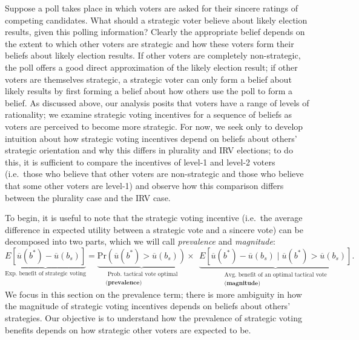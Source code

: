 \documentclass[11pt,a4paper]{article}
\begin{document}
Suppose a poll takes place in which voters are asked for their sincere ratings of competing candidates. What should a strategic voter believe about likely election results, given this polling information? Clearly the appropriate belief depends on the extent to which other voters are strategic and how these voters form their beliefs about likely election results. If other voters are completely non-strategic, the poll offers a good direct approximation of the likely election result; if other voters are themselves strategic, a strategic voter can only form a belief about likely results by first forming a belief about how others use the poll to form a belief. As discussed above, our analysis posits that voters have a range of levels of rationality; we examine strategic voting incentives for a sequence of beliefs as voters are perceived to become more strategic. 
For now, we seek only to develop intuition about how strategic voting incentives depend on beliefs about others' strategic orientation and why this differs in plurality and IRV elections; to do this, it is sufficient to compare the incentives of level-1 and level-2 voters (i.e.\ those who believe that other voters are non-strategic and those who believe that some other voters are level-1) and observe how this comparison differs between the plurality case and the IRV case.  

To begin, it is useful to note that the strategic voting incentive (i.e.\ the average difference in expected utility between a strategic vote and a sincere vote) can be decomposed into two parts, which we will call \emph{prevalence} and \emph{magnitude}: 
\[
\underbrace{E\left[\overline{u}(b^*) - \overline{u}(b_s)\right]}_{\text{Exp.\ benefit of strategic voting}} = \underbrace{\text{Pr}\left( \overline{u}(b^*) > \overline{u}(b_s)\right)}_{\substack{ \text{ Prob.\ tactical vote optimal} \\ \textbf{(prevalence)}} } \times \; \, \underbrace{E\left[ \overline{u}(b^*) - \overline{u}(b_s) \mid \overline{u}(b^*) > \overline{u}(b_s)\right]}_{\substack{\text{Avg.\ benefit of an optimal tactical vote} \\ \textbf{(magnitude)}}}.
\]   
We focus in this section on the prevalence term; there is more ambiguity in how the magnitude of strategic voting incentives depends on beliefs about others' strategies. Our objective is to understand how the prevalence of strategic voting benefits depends on how strategic other voters are expected to be.
  
\end{document}
